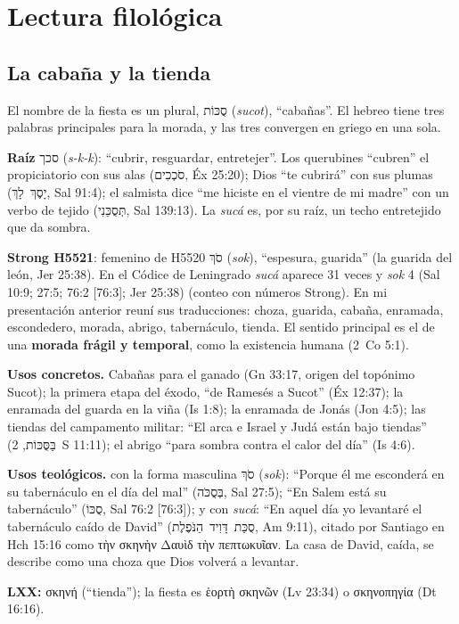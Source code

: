 \documentclass[11pt,letterpaper]{article}
\newcommand{\heb}[1]{\mbox{\foreignlanguage{hebrew}{#1}}}
\newcommand{\grc}[1]{\foreignlanguage{ancientgreek}{#1}}
\newcommand{\destacar}[1]{\textbf{\textcolor{tierraroja}{#1}}}
\begin{document}
\section{Lectura filológica}

\subsection{La cabaña y la tienda}
El nombre de la fiesta es un plural, \heb{סֻכּוֹת} (\emph{sucot}), ``cabañas''. El hebreo tiene tres palabras principales para la morada, y las tres convergen en griego en una sola.

\begin{filologia}[\heb{סֻכָּה} \emph{sucá}, pl.\ \heb{סֻכּוֹת} \emph{sucot}]
\textbf{Raíz} \heb{סכך} (\emph{s-k-k}): ``cubrir, resguardar, entretejer''. Los querubines ``cubren'' el propiciatorio con sus alas (\heb{סֹכְכִים}, Éx 25:20); Dios ``te cubrirá'' con sus plumas (\heb{יָסֶךְ לָךְ}, Sal 91:4); el salmista dice ``me hiciste en el vientre de mi madre'' con un verbo de tejido (\heb{תְּסֻכֵּנִי}, Sal 139:13). La \emph{sucá} es, por su raíz, un techo entretejido que da sombra.\par\smallskip
\textbf{Strong H5521}: femenino de H5520 \heb{סֹךְ} (\emph{sok}), ``espesura, guarida'' (la guarida del león, Jer 25:38). En el Códice de Leningrado \emph{sucá} aparece 31 veces y \emph{sok} 4 (Sal 10:9; 27:5; 76:2 [76:3]; Jer 25:38) (conteo con números Strong). En mi presentación anterior reuní sus traducciones: choza, guarida, cabaña, enramada, escondedero, morada, abrigo, tabernáculo, tienda. El sentido principal es el de una \destacar{morada frágil y temporal}, como la existencia humana (2~Co 5:1).\par\smallskip
\textbf{Usos concretos.} Cabañas para el ganado (Gn 33:17, origen del topónimo Sucot); la primera etapa del éxodo, ``de Ramesés a Sucot'' (Éx 12:37); la enramada del guarda en la viña (Is 1:8); la enramada de Jonás (Jon 4:5); las tiendas del campamento militar: ``El arca e Israel y Judá están bajo tiendas'' (\heb{בַּסֻּכּוֹת}, 2~S 11:11); el abrigo ``para sombra contra el calor del día'' (Is 4:6).\par\smallskip
\textbf{Usos teológicos.} con la forma masculina \heb{סֹךְ} (\emph{sok}): ``Porque él me esconderá en su tabernáculo en el día del mal'' (\heb{בְּסֻכֹּה}, Sal 27:5); ``En Salem está su tabernáculo'' (\heb{סֻכּוֹ}, Sal 76:2 [76:3]); y con \emph{sucá}: ``En aquel día yo levantaré el tabernáculo caído de David'' (\heb{סֻכַּת דָּוִיד הַנֹּפֶלֶת}, Am 9:11), citado por Santiago en Hch 15:16 como \grc{τὴν σκηνὴν Δαυὶδ τὴν πεπτωκυῖαν}. La casa de David, caída, se describe como una choza que Dios volverá a levantar.\par\smallskip
\textbf{LXX:} \grc{σκηνή} (``tienda''); la fiesta es \grc{ἑορτὴ σκηνῶν} (Lv 23:34) o \grc{σκηνοπηγία} (Dt 16:16).
\end{filologia}
\end{document}
